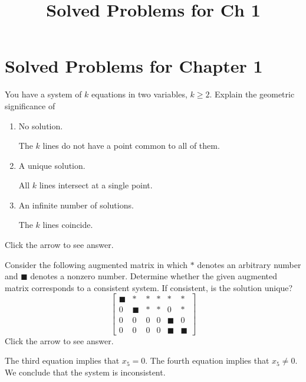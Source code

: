 \documentclass{ximera}
\title{Solved Problems for Ch 1} \license{CC BY-NC-SA 4.0}
\begin{document}
\begin{abstract}
\end{abstract}
\maketitle

\section*{Solved Problems for Chapter 1}


\begin{problem}\label{prb:2.3} You have a system of $k$ equations in two variables, $k\geq 2$.
Explain the geometric significance of

\begin{enumerate}
\item No solution.

\begin{expandable}
    The $k$ lines do not have a point common to all of them.
\end{expandable}
\item A unique solution.

\begin{expandable}
    All $k$ lines intersect at a single point.
\end{expandable}
\item An infinite number of solutions.

\begin{expandable}
    The $k$ lines coincide.
\end{expandable}
\end{enumerate}
Click the arrow to see answer.

\end{problem}

\begin{problem}\label{prb:2.7}
Consider the following augmented matrix in which $\ast $ denotes an arbitrary
number and $\blacksquare $ denotes a nonzero number. Determine whether the
given augmented matrix corresponds to a consistent system. If consistent, is the solution unique?
\begin{equation*}
\left[
\begin{array}{ccccc|c}
\blacksquare & \ast & \ast & \ast & \ast & \ast \\
0 & \blacksquare & \ast & \ast & 0 & \ast \\
0 & 0 & 0 & 0 & \blacksquare & 0 \\
0 & 0 & 0 & 0 & \blacksquare & \blacksquare
\end{array}
\right]
\end{equation*}
Click the arrow to see answer. 
\begin{expandable}
The third equation implies that $x_5 = 0$.  The fourth equation implies that $x_5 \ne 0$.  We conclude that the system is inconsistent.
\end{expandable}
\end{problem}
\end{document}
